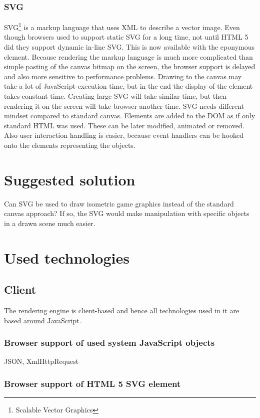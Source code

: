 \documentclass[11pt,oneside, final]{fithesis2}
\begin{document}
\subsection{SVG}
SVG\footnote{Scalable Vector Graphics} is a markup language that uses XML to describe a vector image. Even though browsers used to support static SVG for a long time, not until HTML 5 did they support dynamic in-line SVG\cite{}. This is now available with the eponymous element. Because rendering the markup language is much more complicated than simple pasting of the canvas bitmap on the screen, the browser support is delayed and also more sensitive to performance problems. Drawing to the canvas may take a lot of JavaScript execution time, but in the end the display of the element takes constant time. Creating large SVG will take similar time, but then rendering it on the screen will take browser another time. 
SVG needs different mindset compared to standard canvas. Elements are added to the DOM as if only standard HTML was used. These can be later modified, animated or removed. Also user interaction handling is easier, because event handlers can be hooked onto the elements representing the objects.

\chapter{Suggested solution}
\label{solution}
Can SVG be used to draw isometric game graphics instead of the standard canvas approach? If so, the SVG would make manipulation with specific objects in a drawn scene much easier.

\chapter{Used technologies}
\label{tech}
\section{Client}
The rendering engine is client-based and hence all technologies used in it are based around JavaScript.

\subsection{Browser support of used system JavaScript objects}
JSON, XmlHttpRequest

\subsection{Browser support of HTML 5 SVG element}
\end{document}
